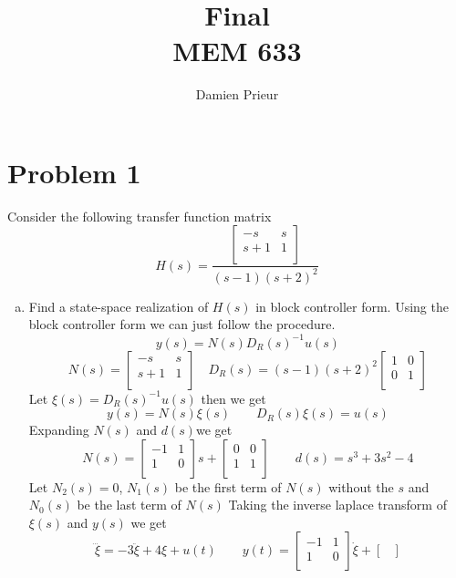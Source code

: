 \documentclass{article}
\author{Damien Prieur}
\title{Final \\ MEM 633}
\date{}
\begin{document}
\maketitle

\section*{Problem 1}
Consider the following transfer function matrix
$$
H(s) = \frac{
    \begin{bmatrix}
        -s & s \\
        s+1 & 1 \\
    \end{bmatrix}
}{(s-1)(s+2)^2}
$$
\begin{enumerate}[(a)]
\item Find a state-space realization of $H(s)$ in block controller form.
\newline
Using the block controller form we can just follow the procedure.
$$ y(s) = N(s) D_R(s)^{-1}u(s) $$
$$
N(s) =
\begin{bmatrix}
-s & s \\
s+1 & 1 \\
\end{bmatrix}
\quad
D_R(s) =
(s-1)(s+2)^2
\begin{bmatrix}
1 & 0 \\
0 & 1 \\
\end{bmatrix}
$$
Let $\xi(s) = D_R(s)^{-1}u(s)$ then we get
$$ y(s) = N(s) \xi(s) \qquad D_R(s)\xi(s) = u(s) $$
Expanding $N(s)$ and $d(s)$we get
$$
N(s) =
\begin{bmatrix}
-1 & 1 \\
1 & 0 \\
\end{bmatrix}
s
+
\begin{bmatrix}
0 & 0 \\
1 & 1 \\
\end{bmatrix}
\qquad
d(s) = s^3 + 3s^2 - 4
$$
Let $N_2(s) = 0$, $N_1(s)$ be the first term of $N(s)$ without the $s$ and $N_0(s)$ be the last term of $N(s)$
\newline
Taking the inverse laplace transform of $\xi(s)$ and $y(s)$ we get
$$
\dddot{\xi} =  - 3 \ddot{\xi} + 4\xi + u(t)
\qquad
y(t) =
\begin{bmatrix}
-1 & 1 \\
1 & 0 \\
\end{bmatrix}
\dot{\xi}
+
\begin{bmatrix}

\end{bmatrix}$$
\end{enumerate}
\end{document}
